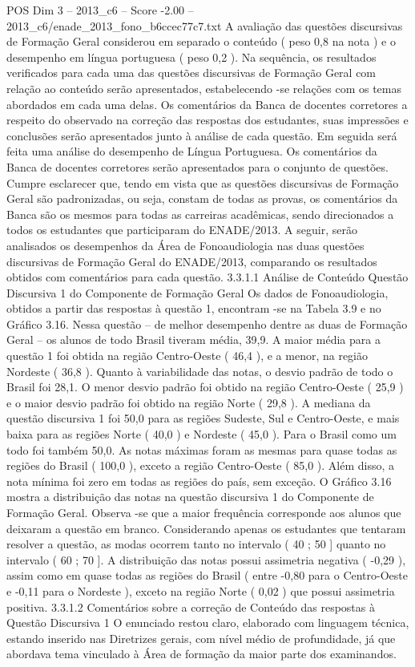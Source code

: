\begin{textsample}{POS Dim 3 – 2013\_c6 – Score -2.00 – 2013\_c6/enade\_2013\_fono\_b6ccec77c7.txt}
A avaliação das questões discursivas de Formação Geral considerou em separado o conteúdo ( peso 0,8 na nota ) e o desempenho em língua portuguesa ( peso 0,2 ).
Na sequência, os resultados verificados para cada uma das questões discursivas de Formação Geral com relação ao conteúdo serão apresentados, estabelecendo -se relações com os temas abordados em cada uma delas.
Os comentários da Banca de docentes corretores a respeito do observado na correção das respostas dos estudantes, suas impressões e conclusões serão apresentados junto à análise de cada questão.
Em seguida será feita uma análise do desempenho de Língua Portuguesa.
Os comentários da Banca de docentes corretores serão apresentados para o conjunto de questões.
Cumpre esclarecer que, tendo em vista que as questões discursivas de Formação Geral são padronizadas, ou seja, constam de todas as provas, os comentários da Banca são os mesmos para todas as carreiras acadêmicas, sendo direcionados a todos os estudantes que participaram do ENADE/2013.
A seguir, serão analisados os desempenhos da Área de Fonoaudiologia nas duas questões discursivas de Formação Geral do ENADE/2013, comparando os resultados obtidos com comentários para cada questão. 3.3.1.1 Análise de Conteúdo Questão Discursiva 1 do Componente de Formação Geral Os dados de Fonoaudiologia, obtidos a partir das respostas à questão 1, encontram -se na Tabela 3.9 e no Gráfico 3.16.
Nessa questão – de melhor desempenho dentre as duas de Formação Geral – os alunos de todo Brasil tiveram média, 39,9.
A maior média para a questão 1 foi obtida na região Centro-Oeste ( 46,4 ), e a menor, na região Nordeste ( 36,8 ).
Quanto à variabilidade das notas, o desvio padrão de todo o Brasil foi 28,1.
O menor desvio padrão foi obtido na região Centro-Oeste ( 25,9 ) e o maior desvio padrão foi obtido na região Norte ( 29,8 ).
A mediana da questão discursiva 1 foi 50,0 para as regiões Sudeste, Sul e Centro-Oeste, e mais baixa para as regiões Norte ( 40,0 ) e Nordeste ( 45,0 ).
Para o Brasil como um todo foi também 50,0.
As notas máximas foram as mesmas para quase todas as regiões do Brasil ( 100,0 ), exceto a região Centro-Oeste ( 85,0 ).
Além disso, a nota mínima foi zero em todas as regiões do país, sem exceção.
O Gráfico 3.16 mostra a distribuição das notas na questão discursiva 1 do Componente de Formação Geral.
Observa -se que a maior frequência corresponde aos alunos que deixaram a questão em branco.
Considerando apenas os estudantes que tentaram resolver a questão, as modas ocorrem tanto no intervalo ( 40 ; 50 ] quanto no intervalo ( 60 ; 70 ].
A distribuição das notas possui assimetria negativa ( -0,29 ), assim como em quase todas as regiões do Brasil ( entre -0,80 para o Centro-Oeste e -0,11 para o Nordeste ), exceto na região Norte ( 0,02 ) que possui assimetria positiva. 3.3.1.2 Comentários sobre a correção de Conteúdo das respostas à Questão Discursiva 1 O enunciado restou claro, elaborado com linguagem técnica, estando inserido nas Diretrizes gerais, com nível médio de profundidade, já que abordava tema vinculado à Área de formação da maior parte dos examinandos.

\end{textsample}
